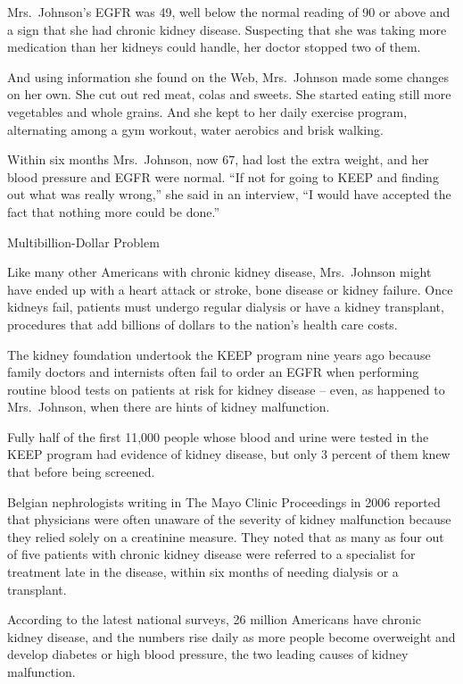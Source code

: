 ﻿\documentclass[12pt]{article}
\begin{document}
Mrs.~Johnson's EGFR was 49, well below the normal reading of 90 or above and a sign that she had
chronic\cite{chronic} kidney disease. Suspecting that she was taking more medication than her
kidneys could handle, her doctor stopped two of them.

And using information she found on the Web, Mrs.~Johnson made some changes on her own. She cut out
red meat, colas and sweets. She started eating still more vegetables and whole grains. And she kept
to her daily exercise program, alternating among a gym workout, water aerobics and brisk walking.

Within six months Mrs.~Johnson, now 67, had lost the extra weight, and her blood pressure and EGFR
were normal. ``If not for going to KEEP and finding out what was really wrong,'' she said in an
interview, ``I would have accepted the fact that nothing more could be done.''

Multibillion-Dollar Problem

Like many other Americans with chronic kidney disease, Mrs.~Johnson might have ended
up with a heart attack or stroke, bone disease or kidney failure. Once kidneys fail, patients must
undergo regular dialysis or have a kidney transplant, procedures that add billions of dollars to the
nation's health care costs.

The kidney foundation undertook the KEEP program nine years ago because family doctors and
internists often fail to order an EGFR when performing routine blood tests on patients at risk for
kidney disease -- even, as happened to Mrs.~Johnson, when there are hints of kidney malfunction.

Fully half of the first 11,000 people whose blood and urine were tested in the KEEP program had
evidence of kidney disease, but only 3 percent of them knew that before being screened.

Belgian nephrologists writing in The Mayo Clinic Proceedings in 2006 reported that physicians were
often unaware of the severity\cite{severity} of kidney malfunction because they relied solely on a
creatinine measure. They noted that as many as four out of five patients with chronic kidney disease
were referred to a specialist for treatment late in the disease, within six months of needing
dialysis or a transplant.

According to the latest national surveys, 26 million Americans have chronic kidney disease, and the
numbers rise daily as more people become overweight and develop diabetes or high blood pressure, the
two leading causes of kidney malfunction.
\end{document}
